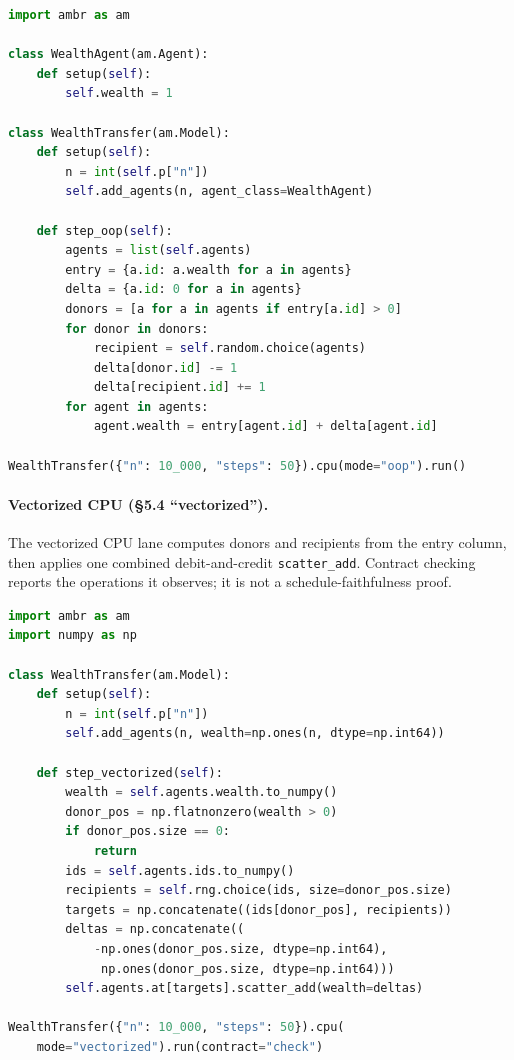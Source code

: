 \documentclass[sigconf,nonacm,review,natbib=true]{acmart}
\theoremstyle{definition}
\theoremstyle{plain}
\theoremstyle{remark}
\begin{document}
\begin{lstlisting}[style=applisting,language=Python,caption={AMBER wealth transfer --- OOP loop baseline (\S5.4 ``loop'').},label={lst:amber-loop}]
import ambr as am

class WealthAgent(am.Agent):
    def setup(self):
        self.wealth = 1

class WealthTransfer(am.Model):
    def setup(self):
        n = int(self.p["n"])
        self.add_agents(n, agent_class=WealthAgent)

    def step_oop(self):
        agents = list(self.agents)
        entry = {a.id: a.wealth for a in agents}
        delta = {a.id: 0 for a in agents}
        donors = [a for a in agents if entry[a.id] > 0]
        for donor in donors:
            recipient = self.random.choice(agents)
            delta[donor.id] -= 1
            delta[recipient.id] += 1
        for agent in agents:
            agent.wealth = entry[agent.id] + delta[agent.id]

WealthTransfer({"n": 10_000, "steps": 50}).cpu(mode="oop").run()
\end{lstlisting}

\paragraph{Vectorized CPU (\S5.4 ``vectorized'').}
The vectorized CPU lane computes donors and recipients from the entry column,
then applies one combined debit-and-credit \texttt{scatter\_add}. Contract
checking reports the operations it observes; it is not a
schedule-faithfulness proof.

\begin{lstlisting}[style=applisting,language=Python,caption={AMBER wealth transfer --- vectorized CPU idiom.},label={lst:amber-cpu}]
import ambr as am
import numpy as np

class WealthTransfer(am.Model):
    def setup(self):
        n = int(self.p["n"])
        self.add_agents(n, wealth=np.ones(n, dtype=np.int64))

    def step_vectorized(self):
        wealth = self.agents.wealth.to_numpy()
        donor_pos = np.flatnonzero(wealth > 0)
        if donor_pos.size == 0:
            return
        ids = self.agents.ids.to_numpy()
        recipients = self.rng.choice(ids, size=donor_pos.size)
        targets = np.concatenate((ids[donor_pos], recipients))
        deltas = np.concatenate((
            -np.ones(donor_pos.size, dtype=np.int64),
             np.ones(donor_pos.size, dtype=np.int64)))
        self.agents.at[targets].scatter_add(wealth=deltas)

WealthTransfer({"n": 10_000, "steps": 50}).cpu(
    mode="vectorized").run(contract="check")
\end{lstlisting}
\end{document}
